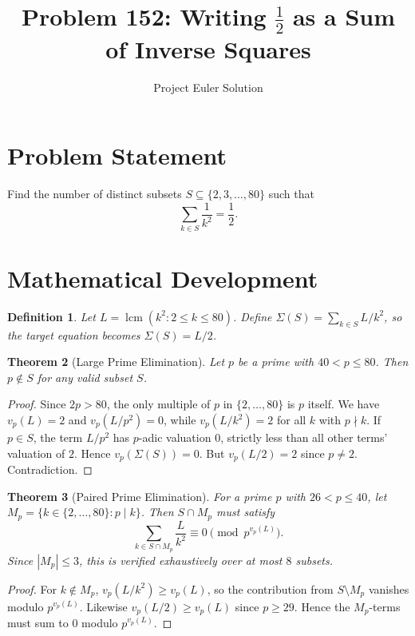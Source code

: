 \documentclass[12pt]{article}
\title{Problem 152: Writing $\frac{1}{2}$ as a Sum of Inverse Squares}
\author{Project Euler Solution}
\date{}
\newtheorem{theorem}{Theorem}
\newtheorem{definition}[theorem]{Definition}
\begin{document}
\maketitle

\section{Problem Statement}

Find the number of distinct subsets $S \subseteq \{2, 3, \ldots, 80\}$ such that
\[
\sum_{k \in S} \frac{1}{k^2} = \frac{1}{2}.
\]

\section{Mathematical Development}

\begin{definition}
Let $L = \operatorname{lcm}(k^2 : 2 \le k \le 80)$. Define $\Sigma(S) = \sum_{k \in S} L/k^2$, so the target equation becomes $\Sigma(S) = L/2$.
\end{definition}

\begin{theorem}[Large Prime Elimination]
\label{thm:large-prime}
Let $p$ be a prime with $40 < p \le 80$. Then $p \notin S$ for any valid subset $S$.
\end{theorem}

\begin{proof}
Since $2p > 80$, the only multiple of $p$ in $\{2, \ldots, 80\}$ is $p$ itself. We have $v_p(L) = 2$ and $v_p(L/p^2) = 0$, while $v_p(L/k^2) = 2$ for all $k$ with $p \nmid k$. If $p \in S$, the term $L/p^2$ has $p$-adic valuation $0$, strictly less than all other terms' valuation of $2$. Hence $v_p(\Sigma(S)) = 0$. But $v_p(L/2) = 2$ since $p \neq 2$. Contradiction.
\end{proof}

\begin{theorem}[Paired Prime Elimination]
\label{thm:paired}
For a prime $p$ with $26 < p \le 40$, let $M_p = \{k \in \{2,\ldots,80\} : p \mid k\}$. Then $S \cap M_p$ must satisfy
\[
\sum_{k \in S \cap M_p} \frac{L}{k^2} \equiv 0 \pmod{p^{v_p(L)}}.
\]
Since $|M_p| \le 3$, this is verified exhaustively over at most $8$ subsets.
\end{theorem}

\begin{proof}
For $k \notin M_p$, $v_p(L/k^2) \ge v_p(L)$, so the contribution from $S \setminus M_p$ vanishes modulo $p^{v_p(L)}$. Likewise $v_p(L/2) \ge v_p(L)$ since $p \ge 29$. Hence the $M_p$-terms must sum to $0$ modulo $p^{v_p(L)}$.
\end{proof}
\end{document}
